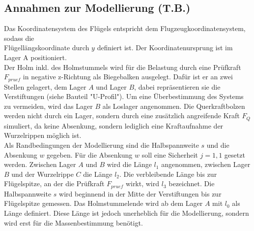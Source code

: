 \subsection{Annahmen zur Modellierung (T.B.)}
Das Koordinatensystem des Flügels entspricht dem Flugzeugkoordinatensystem, sodass die \\Flügellängskoordinate durch $y$ definiert ist. Der Koordinatenursprung ist im Lager A positioniert. \\

\noindent Der Holm inkl. des Holmstummels wird für die Belastung durch eine Prüfkraft $F_{pruef}$ in negative z-Richtung als Biegebalken ausgelegt. Dafür ist er an zwei Stellen gelagert, dem Lager $A$ und Lager $B$, dabei repräsentieren sie die Verstiftungen (siehe Bauteil "U-Profil"). Um eine Überbestimmung des Systems zu vermeiden, wird das Lager $B$ als Loslager angenommen. Die Querkraftbolzen werden nicht durch ein Lager, sondern durch eine zusätzlich angreifende Kraft $F_{Q}$ simuliert, da keine Absenkung, sondern lediglich eine Kraftaufnahme der Wurzelrippen möglich ist. \\

\noindent Als Randbedingungen der Modellierung sind die Halbspannweite $s$ und die Absenkung $w$ gegeben. Für die Absenkung $w$ soll eine Sicherheit $j=1,1$ gesetzt werden. Zwischen Lager $A$ und $B$ wird die Länge $l_{1}$ angenommen, zwischen Lager $B$ und der Wurzelrippe $C$ die Länge $l_{2}$. Die verbleibende Länge bis zur Flügelspitze, an der die Prüfkraft $F_{pruef}$ wirkt, wird $l_{3}$ bezeichnet. Die Halbspannweite $s$ wird beginnend in der Mitte der Verstiftungen bis zur Flügelspitze gemessen. Das Holmstummelende wird ab dem Lager $A$ mit $l_{0}$ als Länge definiert. Diese Länge ist jedoch unerheblich für die Modellierung, sondern wird erst für die Massenbestimmung benötigt.\\

